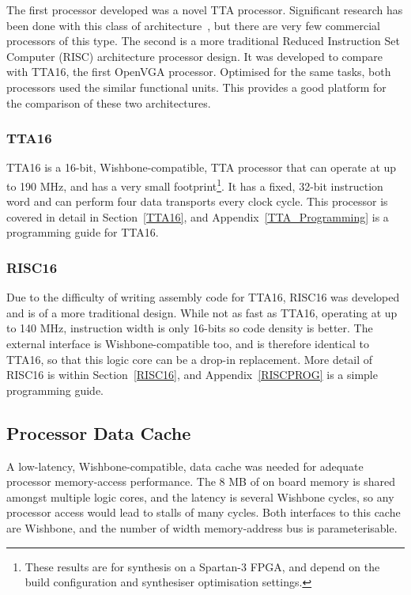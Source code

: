 The first processor developed was a novel TTA processor. Significant research has
been done with this class of architecture~\cite{corporaal1993maa,
jaaskelainen2007cta}, but there are very few commercial processors of this type.
The second is a more traditional Reduced Instruction Set
Computer
(RISC) architecture processor design. It was developed to compare with TTA16, the
first OpenVGA processor. Optimised for the same tasks, both processors used the
similar functional units. This provides a good platform for the comparison of
these two architectures.


\subsubsection{TTA16}
TTA16 is a 16-bit, Wishbone-compatible, TTA processor that can operate at up to
190 MHz, and has a very small footprint\footnote{These results are for synthesis
on a Spartan-3 FPGA, and depend on the build configuration and synthesiser
optimisation settings.}. It has a fixed, 32-bit instruction word and can perform
four data transports every clock cycle. This processor is covered in detail in
Section~\ref{TTA16}, and Appendix~\ref{TTA_Programming} is a programming guide
for TTA16.


\subsubsection{RISC16}
Due to the difficulty of writing assembly code for TTA16, RISC16 was developed
and is of a more traditional design. While not as fast as TTA16, operating at up
to 140 MHz, instruction width is only 16-bits so code density is better. The
external interface is Wishbone-compatible too, and is therefore identical to
TTA16, so that this logic core can be a drop-in replacement. More detail of
RISC16 is within Section~\ref{RISC16}, and Appendix~\ref{RISCPROG} is a simple
programming guide.


\subsection{Processor Data Cache}
A low-latency, Wishbone-compatible, data cache was needed for adequate processor
memory-access performance. The 8 MB of on board memory is shared amongst multiple
logic cores, and the latency is several Wishbone cycles, so any processor access
would lead to stalls of many cycles. Both interfaces to this cache are Wishbone,
and the number of width memory-address bus is parameterisable.

